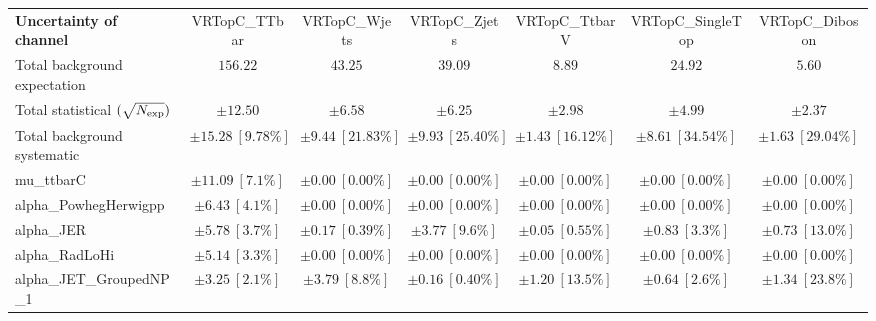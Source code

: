 
\begin{sidewaystable}
\begin{center}
\setlength{\tabcolsep}{0.0pc}
\begin{tabular*}{\textwidth}{@{\extracolsep{\fill}}lcccccc}
\noalign{\smallskip}\hline\noalign{\smallskip}
{\bf Uncertainty of channel}                                    & VRTopC\_TTbar            & VRTopC\_Wjets            & VRTopC\_Zjets            & VRTopC\_TtbarV            & VRTopC\_SingleTop            & VRTopC\_Diboson            \\
\noalign{\smallskip}\hline\noalign{\smallskip}
Total background expectation             &  $156.22$        &  $43.25$        &  $39.09$        &  $8.89$        &  $24.92$        &  $5.60$       \\
\noalign{\smallskip}\hline\noalign{\smallskip}
Total statistical $(\sqrt{N_{\rm exp}})$              & $\pm 12.50$        & $\pm 6.58$        & $\pm 6.25$        & $\pm 2.98$        & $\pm 4.99$        & $\pm 2.37$       \\
Total background systematic               & $\pm 15.28\ [9.78\%] $        & $\pm 9.44\ [21.83\%] $        & $\pm 9.93\ [25.40\%] $        & $\pm 1.43\ [16.12\%] $        & $\pm 8.61\ [34.54\%] $        & $\pm 1.63\ [29.04\%] $             \\
\noalign{\smallskip}\hline\noalign{\smallskip}
\noalign{\smallskip}\hline\noalign{\smallskip}
mu\_ttbarC         & $\pm 11.09\ [7.1\%] $          & $\pm 0.00\ [0.00\%] $          & $\pm 0.00\ [0.00\%] $          & $\pm 0.00\ [0.00\%] $          & $\pm 0.00\ [0.00\%] $          & $\pm 0.00\ [0.00\%] $       \\
alpha\_PowhegHerwigpp         & $\pm 6.43\ [4.1\%] $          & $\pm 0.00\ [0.00\%] $          & $\pm 0.00\ [0.00\%] $          & $\pm 0.00\ [0.00\%] $          & $\pm 0.00\ [0.00\%] $          & $\pm 0.00\ [0.00\%] $       \\
alpha\_JER         & $\pm 5.78\ [3.7\%] $          & $\pm 0.17\ [0.39\%] $          & $\pm 3.77\ [9.6\%] $          & $\pm 0.05\ [0.55\%] $          & $\pm 0.83\ [3.3\%] $          & $\pm 0.73\ [13.0\%] $       \\
alpha\_RadLoHi         & $\pm 5.14\ [3.3\%] $          & $\pm 0.00\ [0.00\%] $          & $\pm 0.00\ [0.00\%] $          & $\pm 0.00\ [0.00\%] $          & $\pm 0.00\ [0.00\%] $          & $\pm 0.00\ [0.00\%] $       \\
alpha\_JET\_GroupedNP\_1         & $\pm 3.25\ [2.1\%] $          & $\pm 3.79\ [8.8\%] $          & $\pm 0.16\ [0.40\%] $          & $\pm 1.20\ [13.5\%] $          & $\pm 0.64\ [2.6\%] $          & $\pm 1.34\ [23.8\%] $       \\

\end{tabular*}
\end{center}
\end{sidewaystable}
